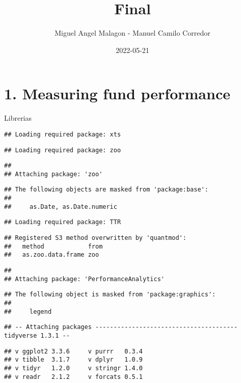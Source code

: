 \documentclass[
]{article}
\title{Final}
\author{Miguel Angel Malagon - Manuel Camilo Corredor}
\date{2022-05-21}
\begin{document}
\maketitle

\hypertarget{measuring-fund-performance}{%
\section{1. Measuring fund
performance}\label{measuring-fund-performance}}

Librerias

\begin{verbatim}
## Loading required package: xts
\end{verbatim}

\begin{verbatim}
## Loading required package: zoo
\end{verbatim}

\begin{verbatim}
## 
## Attaching package: 'zoo'
\end{verbatim}

\begin{verbatim}
## The following objects are masked from 'package:base':
## 
##     as.Date, as.Date.numeric
\end{verbatim}

\begin{verbatim}
## Loading required package: TTR
\end{verbatim}

\begin{verbatim}
## Registered S3 method overwritten by 'quantmod':
##   method            from
##   as.zoo.data.frame zoo
\end{verbatim}

\begin{verbatim}
## 
## Attaching package: 'PerformanceAnalytics'
\end{verbatim}

\begin{verbatim}
## The following object is masked from 'package:graphics':
## 
##     legend
\end{verbatim}

\begin{verbatim}
## -- Attaching packages --------------------------------------- tidyverse 1.3.1 --
\end{verbatim}

\begin{verbatim}
## v ggplot2 3.3.6     v purrr   0.3.4
## v tibble  3.1.7     v dplyr   1.0.9
## v tidyr   1.2.0     v stringr 1.4.0
## v readr   2.1.2     v forcats 0.5.1
\end{verbatim}
\end{document}
